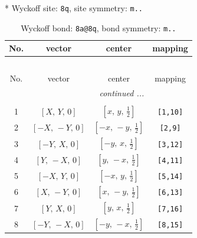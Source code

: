 \documentclass[fleqn,8pt]{jsarticle}
\begin{document}
* Wyckoff site: {\tt 8q}, site symmetry: {\tt m..}
\renewcommand{\arraystretch}{1.2}
\begin{longtable}{cccc}
\caption{Wyckoff bond: {\tt 8a@8q}, bond symmetry: {\tt m..}}
 \\
 \hline \hline
No. & vector & center & mapping \\ \hline \endfirsthead

\multicolumn{3}{l}{\tablename\ \thetable{}} \\
 \hline \hline
No. & vector & center & mapping \\ \hline \endhead

 \hline \hline
\multicolumn{3}{r}{\footnotesize\it continued ...} \\ \endfoot

 \hline \hline
\multicolumn{3}{r}{} \\ \endlastfoot

1 & $\left[ X,\, Y,\, 0 \right]$ & $\left[ x,\, y,\, \frac{1}{2} \right]$ & {\tt [1,10]} \\ \hline
2 & $\left[ - X,\, - Y,\, 0 \right]$ & $\left[ - x,\, - y,\, \frac{1}{2} \right]$ & {\tt [2,9]} \\ \hline
3 & $\left[ - Y,\, X,\, 0 \right]$ & $\left[ - y,\, x,\, \frac{1}{2} \right]$ & {\tt [3,12]} \\ \hline
4 & $\left[ Y,\, - X,\, 0 \right]$ & $\left[ y,\, - x,\, \frac{1}{2} \right]$ & {\tt [4,11]} \\ \hline
5 & $\left[ - X,\, Y,\, 0 \right]$ & $\left[ - x,\, y,\, \frac{1}{2} \right]$ & {\tt [5,14]} \\ \hline
6 & $\left[ X,\, - Y,\, 0 \right]$ & $\left[ x,\, - y,\, \frac{1}{2} \right]$ & {\tt [6,13]} \\ \hline
7 & $\left[ Y,\, X,\, 0 \right]$ & $\left[ y,\, x,\, \frac{1}{2} \right]$ & {\tt [7,16]} \\ \hline
8 & $\left[ - Y,\, - X,\, 0 \right]$ & $\left[ - y,\, - x,\, \frac{1}{2} \right]$ & {\tt [8,15]} \\
\end{longtable}
\renewcommand{\arraystretch}{1.2}
\end{document}
